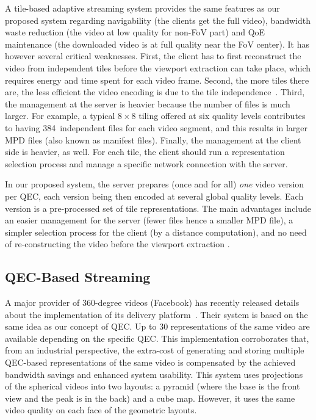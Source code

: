 A tile-based adaptive streaming system provides the same features as
our proposed system regarding navigability (the clients get the full
video), bandwidth waste reduction (the video at low quality for
non-\ac{FoV} part) and \ac{QoE} maintenance (the downloaded video is
at full quality near the \ac{FoV} center). It has however several
critical weaknesses. First, the client has to first reconstruct the
video from independent tiles before the viewport extraction can take
place, which requires energy and time spent for each video frame.
Second, the more tiles there are, the less efficient the video
encoding is due to the tile
independence~\cite{sanchez_compressed_2015}. Third, the management at
the server is heavier because the number of files is much larger. For
example, a typical $8\times8$ tiling offered at six quality levels
contributes to having 384~independent files for each video segment,
and this results in larger \ac{MPD} files (also known as manifest
files). Finally, the management at the client side is heavier, as
well. For each tile, the client should run a representation selection
process and manage a specific network connection with the server.

 In our proposed system, the server prepares
(once and for all) \emph{one} video version per \ac{QEC}, each version
being then encoded at several global quality levels. Each version is a
pre-processed set of tile representations. The main advantages include
an easier management for the server (fewer files hence a smaller
\ac{MPD} file), a simpler selection process for the client (by a
distance computation), and no need of re-constructing the video before
the viewport extraction .

\subsection{QEC-Based Streaming}

A major  provider of 360-degree videos (Facebook) has recently
released details about the implementation of its delivery
platform~\cite{facebook}. Their system is based on the same idea as
our concept of \ac{QEC}. Up to 30 representations of the same video
are available depending on the specific \ac{QEC}. This implementation
corroborates that, from an industrial perspective, the extra-cost of
generating and storing multiple \ac{QEC}-based representations of the
same video is compensated by the achieved bandwidth savings and
enhanced system usability. This system uses projections of the
spherical videos into two layouts: a pyramid (where the base is the
front view and the peak is in the back) and a cube map. However, it
uses the same video quality on each face of the geometric layouts.

